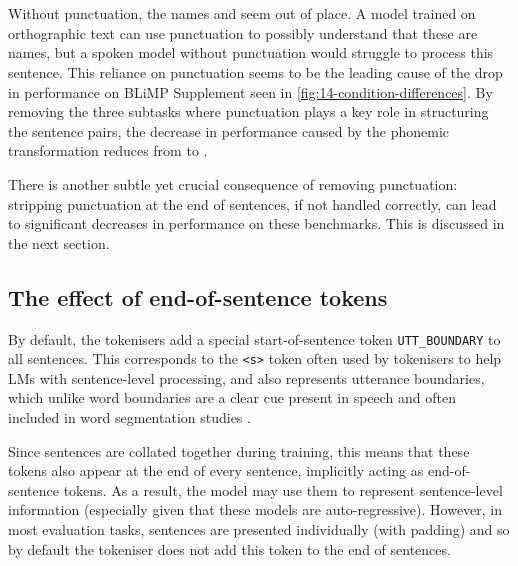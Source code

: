 \vspace{-1mm}
\begin{center}
~\textvisiblespace~~\textvisiblespace~~\textvisiblespace~~\textvisiblespace~~~~\textvisiblespace~~\textvisiblespace~~\textvisiblespace\\~~\textvisiblespace~~\textvisiblespace~~\textvisiblespace
\end{center}
\vspace{-1mm}

Without punctuation, the names  and  seem out of place. A model trained on orthographic text can use punctuation to possibly understand that these are names, but a spoken model without punctuation would struggle to process this sentence. This reliance on punctuation seems to be the leading cause of the drop in performance on BLiMP Supplement seen in \cref{fig:14-condition-differences}. By removing the three subtasks where punctuation plays a key role in structuring the sentence pairs, the decrease in performance caused by the phonemic transformation reduces from  to .

There is another subtle yet crucial consequence of removing punctuation: stripping punctuation at the end of sentences, if not handled correctly, can lead to significant decreases in performance on these benchmarks. This is discussed in the next section.

\subsection{The effect of end-of-sentence tokens}\label{sec:14-endofsentence}

By default, the tokenisers add a special start-of-sentence token \texttt{UTT\_BOUNDARY} to all sentences. This corresponds to the \texttt{<s>} token often used by tokenisers to help LMs with sentence-level processing, and also represents utterance boundaries, which unlike word boundaries are a clear cue present in speech and often included in word segmentation studies \citep{feliciano-de-faria-2019-utterance-boundaries}. 

Since sentences are collated together during training, this means that these tokens also appear at the end of every sentence, implicitly acting as end-of-sentence tokens. As a result, the model may use them to represent sentence-level information (especially given that these models are auto-regressive). However, in most evaluation tasks, sentences are presented individually (with padding) and so by default the tokeniser does not add this token to the end of sentences. 

